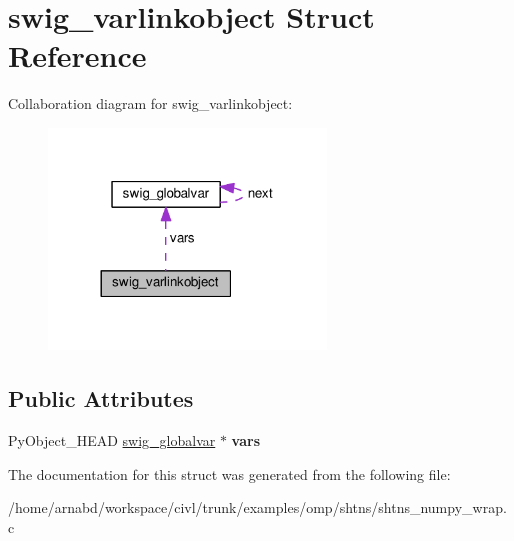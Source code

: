 \hypertarget{structswig__varlinkobject}{}\section{swig\+\_\+varlinkobject Struct Reference}
\label{structswig__varlinkobject}


Collaboration diagram for swig\+\_\+varlinkobject\+:
\nopagebreak
\begin{figure}[H]
\begin{center}
\leavevmode
\includegraphics[width=209pt]{structswig__varlinkobject__coll__graph}
\end{center}
\end{figure}
\subsection*{Public Attributes}
\begin{DoxyCompactItemize}
\item 
\hypertarget{structswig__varlinkobject_a8cf96d999cdf0b28a0e90ccb6804c9bd}{}Py\+Object\+\_\+\+H\+E\+A\+D \hyperlink{structswig__globalvar}{swig\+\_\+globalvar} $\ast$ {\bfseries vars}\label{structswig__varlinkobject_a8cf96d999cdf0b28a0e90ccb6804c9bd}

\end{DoxyCompactItemize}


The documentation for this struct was generated from the following file\+:\begin{DoxyCompactItemize}
\item 
/home/arnabd/workspace/civl/trunk/examples/omp/shtns/shtns\+\_\+numpy\+\_\+wrap.\+c\end{DoxyCompactItemize}
